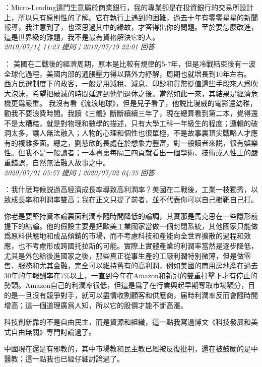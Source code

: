 \documentclass[twocolumn]{ctexart}
\begin{document}
：Micro-Lending這門生意屬於商業銀行，我的專業卻是在投資銀行的交易所設計上，所以只有原則性的了解。它在執行上遇到的困難，過去十年有零零星星的新聞報導，我注意到了，也深思過其中的緣故，才答得出你的問題。至於要怎麼改進，這是世界級的難題，我不是最有資格解決它的人。
\\

\textit{\hfill\noindent\small 2019/07/14 11:23 提问；2019/07/19 22:01 回答}

：
美國在二戰後的經濟周期，原本是比較有規律的5-7年，但是冷戰結束後有一波全球化過程，美國内部的通脹壓力得以藉外力紓解，周期也就增長到10年左右。 
西方民選制度下的政客，一般是用減稅、減息、印鈔和貨幣貶值這些手段來人爲吹大泡沫，希望把破滅的時間延遲到他們退休之後。當然如此一來，其結果是經濟危機更爲嚴重。 
我沒有看《流浪地球》，但是兒子看了，他説比漫威的電影還幼稚，勸我不要浪費時間。我讀《三體》斷斷續續三年了，現在總算看到第二本，覺得還不是太糟糕，就是對物理和數學的描述，只有大學工科一年級生的程度；邏輯的破洞太多，讓人無法融入；人物的心理和個性也很單極，不是故事裏頂尖戰略人才應有的複雜多面。總之，劉慈欣的長處在於想象力豐富，對一般讀者來説，很有娛樂性。但我不是一般讀者；一本書裏每隔三四頁就看出一個學術、技術或人性上的嚴重錯誤，自然無法融入故事之中。
\\

\textit{\hfill\noindent\small 2020/07/01 05:57 提问；2020/07/02 04:35 回答}

：我什麽時候説過高經濟成長率導致高利潤率？美國在二戰後，工業一枝獨秀，以致成長率和利潤率雙高；我在正文只提了前者，並不代表你可以自己樹靶自己打。

你老是要堅持資本論裏面利潤率隨時間降低的論調，其實那是馬克思在一些隱形前提下的結論。他的假設主要是把歐美工業國家當做一個封閉系統，其他國家只能做爲原料供應地和成品傾銷的市場，而不考慮科技和產能向全世界擴散的過程和效應，也不考慮形成跨國托拉斯的可能。實際上實體產業的利潤率當然是逐步降低，尤其是外包給後進國家之後，那些真正從事生產的工廠利潤特別微薄，但是做零售、服務和尤其金融，完全可以維持舊有的高利潤，例如美國的商用房地產在過去30年的年報酬率在7\%以上，一直到今年在Amazon和新冠的雙重打擊下才有停止的勢頭。Amazon自己的利潤率很低，但這是爲了在行業興起早期奪取市場額分，目的是一旦沒有競爭對手，就可以盡情收割顧客和供應商，届時利潤率反而會隨時間增高；這一個道理廣爲人知，所以它的股價才能不斷高漲。

科技創新靠的不是自由民主，而是資源和組織，這一點我寫過博文《科技發展和美式自由無關》專門討論過了。

中國現在還是有邪教的，其中市場教和民主教已經被反復批判，還在被鼓勵的是中醫教；這一點我也已經仔細討論過了。
\\
\end{document}
